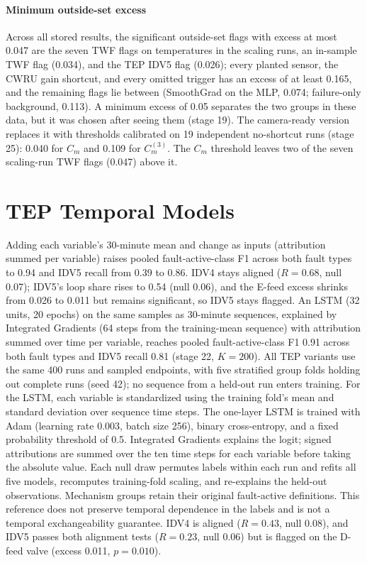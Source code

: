 \documentclass[10pt]{article}
\begin{document}
\paragraph{Minimum outside-set excess} Across all stored results, the significant outside-set flags with excess at most 0.047 are the seven TWF flags on temperatures in the scaling runs, an in-sample TWF flag (0.034), and the TEP IDV5 flag (0.026); every planted sensor, the CWRU gain shortcut, and every omitted trigger has an excess of at least 0.165, and the remaining flags lie between (SmoothGrad on the MLP, 0.074; failure-only background, 0.113). A minimum excess of 0.05 separates the two groups in these data, but it was chosen after seeing them (stage 19). The camera-ready version replaces it with thresholds calibrated on 19 independent no-shortcut runs (stage 25): 0.040 for $C_m$ and 0.109 for $C^{(3)}_m$. The $C_m$ threshold leaves two of the seven scaling-run TWF flags (0.047) above it.

\section{TEP Temporal Models} Adding each variable's 30-minute mean and change as inputs (attribution summed per variable) raises pooled fault-active-class F1 across both fault types to 0.94 and IDV5 recall from 0.39 to 0.86. IDV4 stays aligned ($R=0.68$, null 0.07); IDV5's loop share rises to 0.54 (null 0.06), and the E-feed excess shrinks from 0.026 to 0.011 but remains significant, so IDV5 stays flagged. An LSTM (32 units, 20 epochs) on the same samples as 30-minute sequences, explained by Integrated Gradients (64 steps from the training-mean sequence) with attribution summed over time per variable, reaches pooled fault-active-class F1 0.91 across both fault types and IDV5 recall 0.81 (stage 22, $K=200$). All TEP variants use the same 400 runs and sampled endpoints, with five stratified group folds holding out complete runs (seed 42); no sequence from a held-out run enters training. For the LSTM, each variable is standardized using the training fold's mean and standard deviation over sequence time steps. The one-layer LSTM is trained with Adam (learning rate 0.003, batch size 256), binary cross-entropy, and a fixed probability threshold of 0.5. Integrated Gradients explains the logit; signed attributions are summed over the ten time steps for each variable before taking the absolute value. Each null draw permutes labels within each run and refits all five models, recomputes training-fold scaling, and re-explains the held-out observations. Mechanism groups retain their original fault-active definitions. This reference does not preserve temporal dependence in the labels and is not a temporal exchangeability guarantee. IDV4 is aligned ($R=0.43$, null 0.08), and IDV5 passes both alignment tests ($R=0.23$, null 0.06) but is flagged on the D-feed valve (excess 0.011, $p=0.010$).
\end{document}
